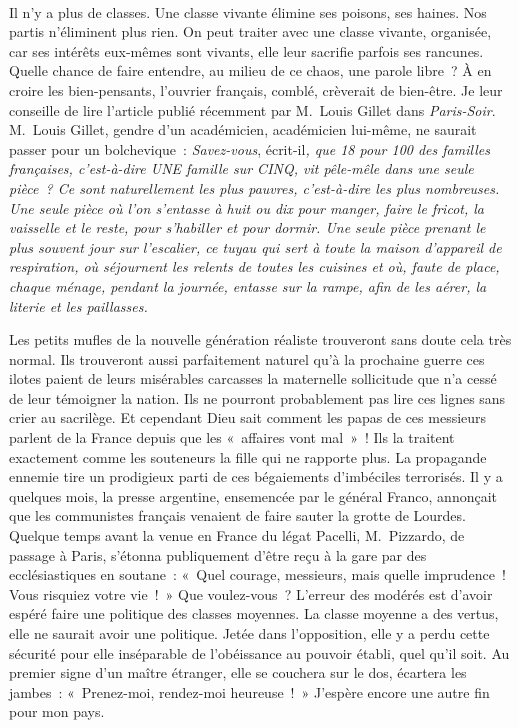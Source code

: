 \documentclass[french,twoside]{book} %
\begin{document}
\noindent  \par
Il n’y a plus de classes. Une classe vivante élimine ses poisons, ses haines. Nos partis n’éliminent plus rien. On peut traiter avec une classe vivante, organisée, car ses intérêts eux-mêmes sont vivants, elle leur sacrifie parfois ses rancunes. Quelle chance de faire entendre, au milieu de ce chaos, une parole libre ? À en croire les bien-pensants, l’ouvrier français, comblé, crèverait de bien-être. Je leur conseille de lire l’article publié récemment par M. Louis Gillet dans \emph{Paris-Soir}. M. Louis Gillet, gendre d’un académicien, académicien lui-même, ne saurait passer pour un bolchevique : \emph{Savez-vous}, écrit-il\emph{, que 18 pour 100 des familles françaises, c’est-à-dire \textsc{UNE} famille sur \textsc{CINQ}, vit pêle-mêle dans une seule pièce ? Ce sont naturellement les plus pauvres, c’est-à-dire les plus nombreuses. Une seule pièce où l’on s’entasse à huit ou dix pour manger, faire le fricot, la vaisselle et le reste, pour s’habiller et pour dormir. Une seule pièce prenant le plus souvent jour sur l’escalier, ce tuyau qui sert à toute la maison d’appareil de respiration, où séjournent les relents de toutes les cuisines et où, faute de place, chaque ménage, pendant la journée, entasse sur la rampe, afin de les aérer, la literie et les paillasses.}\par
Les petits mufles de la nouvelle génération réaliste trouveront sans doute cela très normal. Ils trouveront aussi parfaitement naturel qu’à la prochaine guerre ces ilotes paient de leurs misérables carcasses la maternelle sollicitude que n’a cessé de leur témoigner la nation. Ils ne pourront probablement pas lire ces lignes sans crier au sacrilège. Et cependant Dieu sait comment les papas de ces messieurs parlent de la France depuis que les « affaires vont mal » ! Ils la traitent exactement comme les souteneurs la fille qui ne rapporte plus. La propagande ennemie tire un prodigieux parti de ces bégaiements d’imbéciles terrorisés. Il y a quelques mois, la presse argentine, ensemencée par le général Franco, annonçait que les communistes français venaient de faire sauter la grotte de Lourdes. Quelque temps avant la venue en France du légat Pacelli, M. Pizzardo, de passage à Paris, s’étonna publiquement d’être reçu à la gare par des ecclésiastiques en soutane : « Quel courage, messieurs, mais quelle imprudence ! Vous risquiez votre vie ! » Que voulez-vous ? L’erreur des modérés est d’avoir espéré faire une politique des classes moyennes. La classe moyenne a des vertus, elle ne saurait avoir une politique. Jetée dans l’opposition, elle y a perdu cette sécurité pour elle inséparable de l’obéissance au pouvoir établi, quel qu’il soit. Au premier signe d’un maître étranger, elle se couchera sur le dos, écartera les jambes : « Prenez-moi, rendez-moi heureuse ! » J’espère encore une autre fin pour mon pays.\par
\end{document}
